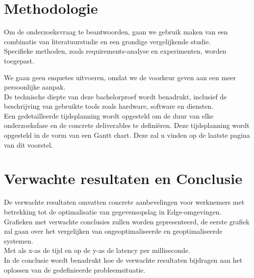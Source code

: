 \newpage


\section{Methodologie}%
\label{sec:methodologie}

Om de onderzoeksvraag te beantwoorden, gaan we gebruik maken van een combinatie van literatuurstudie en een grondige vergelijkende studie. \\
 
Specifieke methoden, zoals requirements-analyse en experimenten, worden toegepast.

We gaan geen enquetes uitvoeren, omdat we de voorkeur geven aan een meer persoonlijke aanpak. \\
 
De technische diepte van deze bachelorproef wordt benadrukt,
 inclusief de beschrijving van gebruikte tools zoals hardware, software en diensten. \\

Een gedetailleerde tijdsplanning wordt opgesteld om de duur van elke onderzoeksfase en de concrete deliverables te definiëren.
Deze tijdsplanning wordt opgesteld in de vorm van een Gantt chart. Deze zal u vinden op de laatste pagina van dit voorstel.





\section{Verwachte resultaten en Conclusie}%
\label{sec:verwachte_resultaten}

De verwachte resultaten omvatten concrete aanbevelingen voor werknemers met betrekking tot de optimalisatie
van gegevensopslag in Edge-omgevingen. \\

Grafieken met verwachte conclusies zullen worden gepresenteerd,
 de eerste grafiek zal gaan over het vergelijken van ongeoptimaliseerde en geoptimaliseerde systemen. \\

Met als x-as de tijd en op de y-as de latency per milliseconde. \\

In de conclusie wordt benadrukt hoe de verwachte resultaten bijdragen aan het oplossen van de gedefinieerde probleemsituatie. \\

